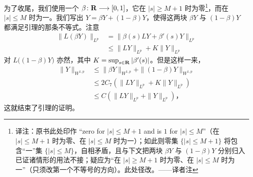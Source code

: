 为了收尾，我们使用一个\trPlateauFunction{} $\beta\colon\mathbf{R}\longrightarrow[0,1]$，它在 $|s|\ge M+1$ 时为零\footnote{译注：原书此处印作 “zero for $|s|\le M+1$ and is $1$ for $|s|\le M$”（在 $|s|\le M+1$ 时为零、在 $|s|\le M$ 时为一）；如此则零集 $\{|s|\le M+1\}$ 将包含“一”集 $\{|s|\le M\}$，自相矛盾，且与下文把两块 $\beta Y$ 与 $(1-\beta)Y$ 分别归入已证诸情形的用法不接；疑应为“在 $|s|\ge M+1$ 时为零、在 $|s|\le M$ 时为一”（只须改第一个不等号的方向）。此处径改。——译者注}，而在 $|s|\le M$ 时为一。我们写出 $Y=\beta Y+(1-\beta)Y$，使得这两块 $\beta Y$ 与 $(1-\beta)Y$ 都满足引理的那条不等式。注意
\[
\begin{aligned}
\|L(\beta Y)\|_{L^{p}}&=\|\beta(s)LY+\beta'(s)Y\|_{L^{p}}\\
&\le\|LY\|_{L^{p}}+K\|Y\|_{L^{p}}
\end{aligned}
\]
对 $L\bigl((1-\beta)Y\bigr)$ 亦然，其中 $K=\sup_{s\in\mathbf{R}}|\beta'(s)|$。但是这样一来，
\[
\begin{aligned}
\|Y\|_{W^{1,p}}&\le\|\beta Y\|_{W^{1,p}}+\|(1-\beta)Y\|_{W^{1,p}}\\
&\le 2C_{7}\left(\|LY\|_{L^{p}}+K\|Y\|_{L^{p}}\right)\\
&\le C\left(\|LY\|_{L^{p}}+\|Y\|_{L^{p}}\right)\text{，}
\end{aligned}
\]
这就结束了引理的证明。\noqed
